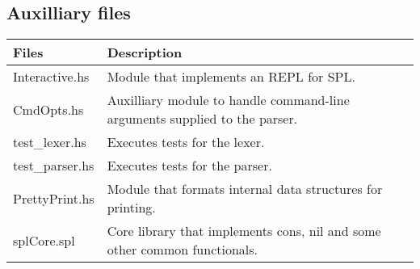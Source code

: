 \documentclass{article}
\begin{document}
\subsection{Auxilliary files}
\begin{tabular}{|l|l|}
  \hline
{\bf Files}&{\bf Description}\\
  \hline
Interactive.hs & Module that implements an REPL for SPL.\\
  \hline
CmdOpts.hs & Auxilliary module to handle command-line arguments supplied to the parser.\\
  \hline
test_lexer.hs & Executes tests for the lexer.\\
  \hline
test_parser.hs & Executes tests for the parser.\\
  \hline
PrettyPrint.hs & Module that formats internal data structures for printing.\\
  \hline
splCore.spl & Core library that implements cons, nil and some other common functionals.\\
  \hline
\end{tabular}
\end{document}
